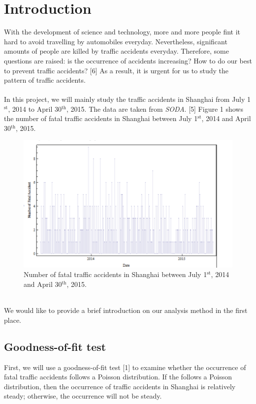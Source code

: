 \documentclass[a4paper,12pt]{article}
\begin{document}
\section{Introduction}
\noindent With the development of science and technology, more and more people fint it hard to avoid travelling by automobiles everyday. Nevertheless, significant amounts of people are killed by traffic accidents everyday. Therefore, some questions are raised: is the occurrence of accidents increasing? How to do our best to prevent traffic accidents? [6] As a result, it is urgent for us to study the pattern of traffic accidents. \\\\
In this project, we will mainly study the traffic accidents in Shanghai from July 1$^{\text{st}}$, 2014 to April 30$^{\text{th}}$, 2015. The data are taken from {\emph {SODA}}. [5] Figure 1 shows the number of fatal traffic accidents in Shanghai between July 1$^{\text{st}}$, 2014 and April 30$^{\text{th}}$, 2015.\\ 
\begin{figure}[hbp]
\centering
\includegraphics[scale=1]{zongtu.PNG}
\caption{Number of fatal traffic accidents in Shanghai between July 1$^{\text{st}}$, 2014 and April 30$^{\text{th}}$, 2015.}
\end{figure}
\\We would like to provide a brief introduction on our analysis method in the first place.
\subsection{Goodness-of-fit test}
\noindent First, we will use a goodness-of-fit test [1]  to examine whether the occurrence of fatal traffic accidents follows a Poisson distribution. If the follows a Poisson distribution, then the occurrence of traffic accidents in Shanghai is relatively steady; otherwise, the occurrence will not be steady.
\end{document}
